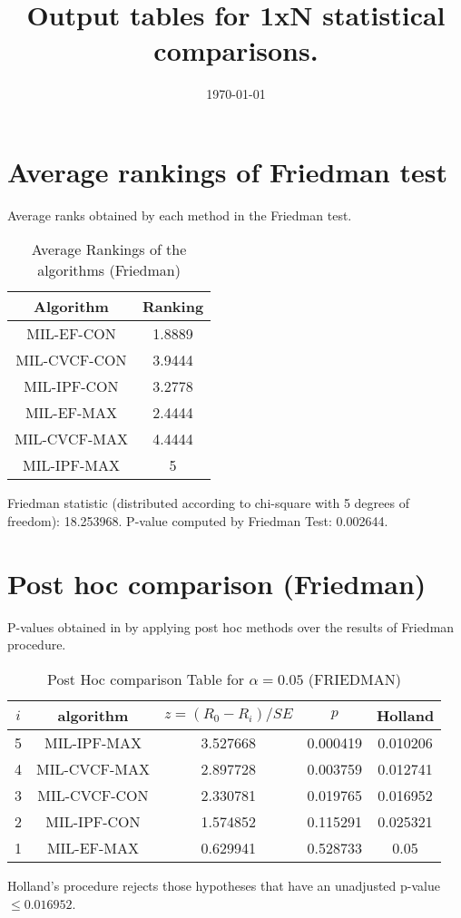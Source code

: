 \documentclass[a4paper,10pt]{article}
\title{Output tables for 1xN statistical comparisons.}
\author{}
\date{\today}
\begin{document}
\begin{landscape}
\pagestyle{empty}
\maketitle
\thispagestyle{empty}

\section{Average rankings of Friedman test}


Average ranks obtained by each method in the Friedman test.

\begin{table}[!htp]
\centering
\begin{tabular}{|c|c|}\hline
Algorithm&Ranking\\\hline
MIL-EF-CON&1.8889\\MIL-CVCF-CON&3.9444\\MIL-IPF-CON&3.2778\\MIL-EF-MAX&2.4444\\MIL-CVCF-MAX&4.4444\\MIL-IPF-MAX&5\\\hline\end{tabular}
\caption{Average Rankings of the algorithms (Friedman)}
\end{table}

Friedman statistic (distributed according to chi-square with 5 degrees of freedom): 18.253968. \newline P-value computed by Friedman Test: 0.002644.\newline


\newpage

\section{Post hoc comparison (Friedman)}


P-values obtained in by applying post hoc methods over the results of Friedman procedure.

\begin{table}[!htp]
\centering\footnotesize
\begin{tabular}{ccccc}
$i$&algorithm&$z=(R_0 - R_i)/SE$&$p$&Holland\\
\hline5&MIL-IPF-MAX&3.527668&0.000419&0.010206\\4&MIL-CVCF-MAX&2.897728&0.003759&0.012741\\3&MIL-CVCF-CON&2.330781&0.019765&0.016952\\2&MIL-IPF-CON&1.574852&0.115291&0.025321\\1&MIL-EF-MAX&0.629941&0.528733&0.05\\\hline
\end{tabular}
\caption{Post Hoc comparison Table for $\alpha=0.05$ (FRIEDMAN)}
\end{table}Holland's procedure rejects those hypotheses that have an unadjusted p-value $\le0.016952$.



\end{landscape}
\end{document}
